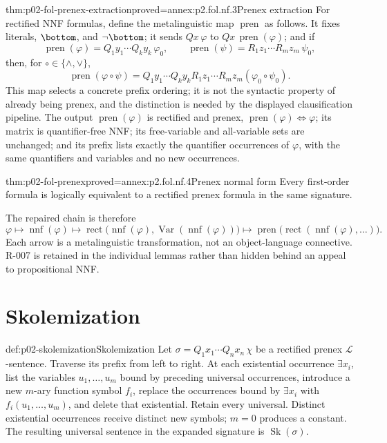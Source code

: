 \begin{hblemma}{thm:p02-fol-prenex-extraction}{proved=annex:p2.fol.nf.3}{Prenex extraction}
For rectified NNF formulas, define the metalinguistic map
\(\operatorname{pren}\) as follows.  It fixes literals, \(\bottom\), and
\(\neg\bottom\); it sends \(Qx\,\varphi\) to
\(Qx\,\operatorname{pren}(\varphi)\); and if
\[
 \operatorname{pren}(\varphi)=Q_1y_1\cdots Q_ky_k\,\varphi_0,
 \qquad
 \operatorname{pren}(\psi)=R_1z_1\cdots R_mz_m\,\psi_0,
\]
then, for \(\circ\in\{\land,\lor\}\),
\[
 \operatorname{pren}(\varphi\mathbin\circ\psi)
 =Q_1y_1\cdots Q_ky_kR_1z_1\cdots R_mz_m
   (\varphi_0\mathbin\circ\psi_0).
\]
This map selects a concrete prefix ordering; it is not the syntactic property
of already being prenex, and the distinction is needed by the displayed
clausification pipeline.
The output \(\operatorname{pren}(\varphi)\) is rectified and prenex,
\(\operatorname{pren}(\varphi)\Leftrightarrow\varphi\); its matrix is
quantifier-free NNF;
its free-variable and all-variable sets are unchanged; and its prefix lists
exactly the quantifier occurrences of \(\varphi\), with the same quantifiers
and variables and no new occurrences.
\end{hblemma}

\begin{hbtheorem}{thm:p02-fol-prenex}{proved=annex:p2.fol.nf.4}{Prenex normal form}
Every first-order formula is logically equivalent to a rectified prenex
formula in the same signature.
\end{hbtheorem}

The repaired chain is therefore
\[
 \varphi\longmapsto\operatorname{nnf}(\varphi)
 \longmapsto \operatorname{rect}\bigl(\operatorname{nnf}(\varphi),
   \operatorname{Var}(\operatorname{nnf}(\varphi))\bigr)
 \longmapsto \operatorname{pren}\bigl(
   \operatorname{rect}(\operatorname{nnf}(\varphi),\ldots)\bigr).
\]
Each arrow is a metalinguistic transformation, not an object-language
connective.  R-007 is retained in the individual lemmas rather than hidden
behind an appeal to propositional NNF.

\section{Skolemization}
\label{sec:p02-fol-skolemization}

\begin{hbdefinition}{def:p02-skolemization}{Skolemization}
Let \(\sigma=Q_1x_1\cdots Q_nx_n\,\chi\) be a rectified prenex
\(\mathcal L\)-sentence.  Traverse its prefix from left to right.  At each
existential occurrence \(\exists x_i\), list the variables
\(u_1,\ldots,u_m\) bound by preceding universal occurrences, introduce a
new \(m\)-ary function symbol \(f_i\), replace the occurrences bound by
\(\exists x_i\) with \(f_i(u_1,\ldots,u_m)\), and delete that existential.
Retain every universal.  Distinct existential occurrences receive distinct
new symbols; \(m=0\) produces a constant.  The resulting universal sentence
in the expanded signature is \(\operatorname{Sk}(\sigma)\).
\end{hbdefinition}

